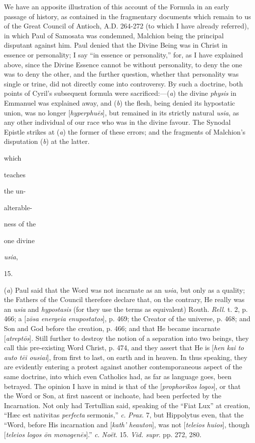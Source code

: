We have
an apposite illustration of this account of the Formula in an
early passage of history, as contained in the fragmentary
documents which remain to us of the Great Council of Antioch, A.D.
264-272 (to which I have already referred), in which Paul of
Samosata was condemned, Malchion being the principal disputant
against him. Paul denied that the Divine Being was in Christ
in essence or personality; I say ``in essence or
personality,'' for, as I have explained above, since
the Divine Essence cannot be without personality, to deny the
one was to deny the other, and the further question, whether
that personality was single or trine, did not directly come
into controversy. By such a doctrine, both points of Cyril's
subsequent formula were sacrificed:—(\emph{a}) the divine \emph{physis}
in Emmanuel was explained away, and (\emph{b}) the flesh,
being denied its hypostatic union, was no longer [\emph{hyperphu\={e}s}],
but remained in its strictly natural \emph{usia}, as any other
individual of our race who was in the divine favour. The
Synodal Epistle strikes at (\emph{a}) the former of these
errors; and the fragments of Malchion's disputation (\emph{b})
at the latter.

which

teaches

the un-

alterable-

ness of the

one divine

\emph{usia},

15.

(\emph{a}) Paul said
that the Word was not incarnate as an \emph{usia}, but only as
a quality; the Fathers of the Council therefore declare that,
on the contrary, He really was an \emph{usia} and \emph{hypostasis}
(for they use the terms as equivalent) Routh. \emph{Rell}. t.
2, p. 466; a [\emph{z\={o}sa energeia enupostatos}], p.
469; the Creator of the universe, p. 468; and Son and God
before the creation, p. 466; and that He became incarnate [\emph{atrept\={o}s}].
Still further to destroy the notion of a separation into two
beings, they call this pre-existing Word Christ, p. 474, and
they assert that He is [\emph{hen kai to auto t\={e}i ousiai}],
from first to last, on earth and in heaven. In thus speaking,
they are evidently entering a protest against another
contemporaneous aspect of the same doctrine, into which even
Catholics had, as far as language goes, been betrayed.
The opinion I have in mind is that of the [\emph{prophorikos
logos}], or that the Word or Son, at first nascent or
inchoate, had been perfected by the Incarnation. Not only had
Tertullian said, speaking of the ``Fiat Lux'' at creation, ``Hæc est nativitas \emph{perfecta} sermonis,'' \emph{c}. \emph{Prax}.
7, but Hippolytus even, that the ``Word, before His
incarnation and [\emph{kath' heauton}], was not [\emph{teleios
huios}], though [\emph{teleios logos \={o}n monogen\={e}s}].''
\emph{c}. \emph{Noët}. 15. \emph{Vid. supr}. pp. 272, 280.

